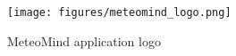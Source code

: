 \begin{figure}[!ht]
\centering
\texttt{[image: figures/meteomind\_logo.png]}
\caption{MeteoMind application logo}
\label{fig:meteomind_logo}
\end{figure}